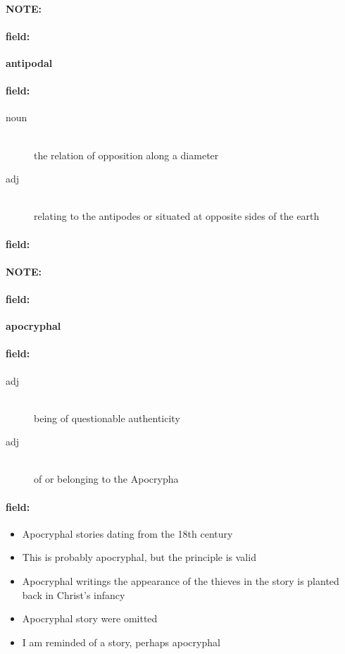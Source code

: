 \documentclass[12pt]{article}
\newenvironment{note}{\paragraph{NOTE:}}{}
\newenvironment{field}{\paragraph{field:}}{}
\begin{document}
\begin{note}
\begin{field}
\textbf{\large antipodal}
\end{field}


\begin{field}
\begin{description}
\item[noun] \hfill \\ 
the relation of opposition along a diameter

\item[adj] \hfill \\ 
relating to the antipodes or situated at opposite sides of the earth

\end{description}
\end{field}

\begin{field}
\end{field}
\end{note}
\begin{note}
\begin{field}
\textbf{\large apocryphal}
\end{field}


\begin{field}
\begin{description}
\item[adj] \hfill \\ 
being of questionable authenticity

\item[adj] \hfill \\ 
of or belonging to the Apocrypha

\end{description}
\end{field}

\begin{field}
\begin{itemize}
\item Apocryphal stories dating from the 18th century
\item This is probably apocryphal, but the principle is valid
\item Apocryphal writings the appearance of the thieves in the story is planted back in Christ's infancy
\item Apocryphal story were omitted
\item I am reminded of a story, perhaps apocryphal
\end{itemize}
\end{field}
\end{note}
\end{document}
